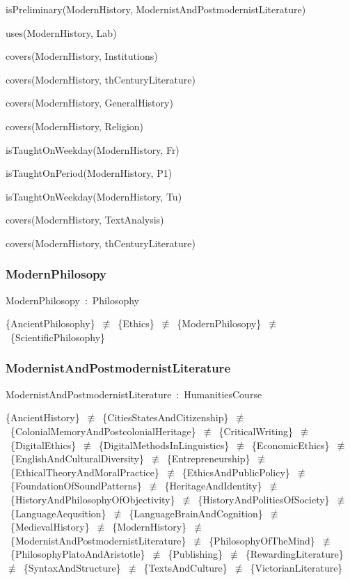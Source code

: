 \documentclass{article}
\begin{document}
isPreliminary(ModernHistory, ModernistAndPostmodernistLiterature)

uses(ModernHistory, Lab)

covers(ModernHistory, Institutions)

covers(ModernHistory, thCenturyLiterature)

covers(ModernHistory, GeneralHistory)

covers(ModernHistory, Religion)

isTaughtOnWeekday(ModernHistory, Fr)

isTaughtOnPeriod(ModernHistory, P1)

isTaughtOnWeekday(ModernHistory, Tu)

covers(ModernHistory, TextAnalysis)

covers(ModernHistory, thCenturyLiterature)

\subsubsection*{ModernPhilosopy}

ModernPhilosopy~:~Philosophy

\{AncientPhilosophy\}~\ensuremath{\not\equiv}~\{Ethics\}~\ensuremath{\not\equiv}~\{ModernPhilosopy\}~\ensuremath{\not\equiv}~\{ScientificPhilosophy\}

\subsubsection*{ModernistAndPostmodernistLiterature}

ModernistAndPostmodernistLiterature~:~HumanitiesCourse

\{AncientHistory\}~\ensuremath{\not\equiv}~\{CitiesStatesAndCitizenship\}~\ensuremath{\not\equiv}~\{ColonialMemoryAndPostcolonialHeritage\}~\ensuremath{\not\equiv}~\{CriticalWriting\}~\ensuremath{\not\equiv}~\{DigitalEthics\}~\ensuremath{\not\equiv}~\{DigitalMethodsInLinguistics\}~\ensuremath{\not\equiv}~\{EconomicEthics\}~\ensuremath{\not\equiv}~\{EnglishAndCulturalDiversity\}~\ensuremath{\not\equiv}~\{Entrepreneurship\}~\ensuremath{\not\equiv}~\{EthicalTheoryAndMoralPractice\}~\ensuremath{\not\equiv}~\{EthicsAndPublicPolicy\}~\ensuremath{\not\equiv}~\{FoundationOfSoundPatterns\}~\ensuremath{\not\equiv}~\{HeritageAndIdentity\}~\ensuremath{\not\equiv}~\{HistoryAndPhilosophyOfObjectivity\}~\ensuremath{\not\equiv}~\{HistoryAndPoliticsOfSociety\}~\ensuremath{\not\equiv}~\{LanguageAcqusition\}~\ensuremath{\not\equiv}~\{LanguageBrainAndCognition\}~\ensuremath{\not\equiv}~\{MedievalHistory\}~\ensuremath{\not\equiv}~\{ModernHistory\}~\ensuremath{\not\equiv}~\{ModernistAndPostmodernistLiterature\}~\ensuremath{\not\equiv}~\{PhilosophyOfTheMind\}~\ensuremath{\not\equiv}~\{PhilosophyPlatoAndAristotle\}~\ensuremath{\not\equiv}~\{Publishing\}~\ensuremath{\not\equiv}~\{RewardingLiterature\}~\ensuremath{\not\equiv}~\{SyntaxAndStructure\}~\ensuremath{\not\equiv}~\{TextsAndCulture\}~\ensuremath{\not\equiv}~\{VictorianLiterature\}
\end{document}
